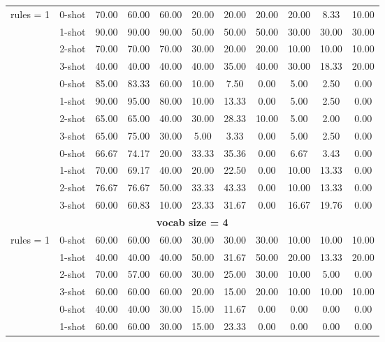 \begin{table*}[t]
{\begin{tabular}{l c ccc ccc ccc}
           \midrule
           \multirow{4}{*}{rules = 1} & 0-shot & 70.00 & 60.00 & 60.00 & 20.00 & 20.00 & 20.00 & 20.00 & 8.33 & 10.00\\
           & 1-shot & 90.00 & 90.00 & 90.00 & 50.00 & 50.00 & 50.00 & 30.00 & 30.00 & 30.00\\
           & 2-shot & 70.00  & 70.00  & 70.00 & 30.00 & 20.00 & 20.00 & 10.00 & 10.00 & 10.00\\
           & 3-shot & 40.00 & 40.00 & 40.00 & 40.00 & 35.00 & 40.00 & 30.00 & 18.33 & 20.00\\
           \hdashline
           \multirow{4}{*}{rules = 2} &  0-shot & 85.00 & 83.33 & 60.00 & 10.00 & 7.50 & 0.00 & 5.00 & 2.50 & 0.00\\
           & 1-shot & 90.00 & 95.00 & 80.00 & 10.00 & 13.33 & 0.00 & 5.00 & 2.50 & 0.00\\
           & 2-shot & 65.00 & 65.00 & 40.00 & 30.00 & 28.33 & 10.00 & 5.00 & 2.00 & 0.00\\
           & 3-shot & 65.00 & 75.00 & 30.00 & 5.00 & 3.33 & 0.00 & 5.00 & 2.50 & 0.00\\
           \hdashline
          \multirow{4}{*}{rules = 3} & 0-shot & 66.67 & 74.17 & 20.00 & 33.33 & 35.36 & 0.00 & 6.67 & 3.43 & 0.00\\
          & 1-shot & 70.00 & 69.17 & 40.00 & 20.00 & 22.50 & 0.00 & 10.00 & 13.33 & 0.00\\
           & 2-shot & 76.67 & 76.67 & 50.00 & 33.33 & 43.33 & 0.00 & 10.00 & 13.33 & 0.00\\
           & 3-shot & 60.00 & 60.83 & 10.00 & 23.33 & 31.67 & 0.00 & 16.67 & 19.76 & 0.00\\
           \midrule \multicolumn{11}{c}{\textbf{vocab size = 4}} \\
           \midrule
           \multirow{4}{*}{rules = 1} & 0-shot & 60.00 & 60.00 & 60.00 & 30.00 & 30.00 & 30.00 & 10.00 & 10.00 & 10.00\\
           & 1-shot & 40.00 & 40.00 & 40.00 & 50.00 & 31.67 & 50.00 & 20.00 & 13.33 & 20.00\\
           & 2-shot & 70.00 & 57.00 & 60.00 & 30.00 & 25.00 & 30.00 & 10.00 & 5.00 & 0.00\\
           & 3-shot & 60.00 & 60.00 & 60.00 & 20.00 & 15.00 & 20.00 & 10.00 & 10.00 & 10.00\\
           \hdashline
           \multirow{4}{*}{rules = 2} &  0-shot & 40.00 & 40.00 & 30.00 & 15.00 & 11.67 & 0.00 & 0.00 & 0.00 & 0.00\\
           & 1-shot & 60.00 & 60.00 & 30.00 & 15.00 & 23.33 & 0.00 & 0.00 & 0.00 & 0.00\\

\end{tabular}}
\end{table*}

